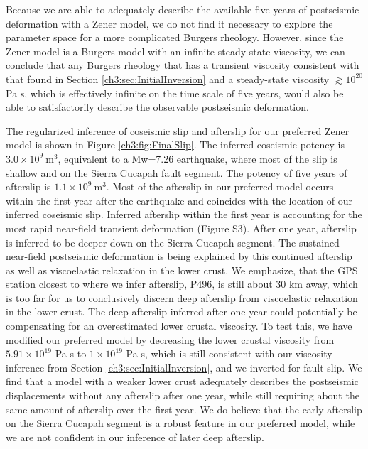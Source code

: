 Because we are able to adequately describe the available five years of postseismic deformation with a Zener model, we do not find it necessary to explore the parameter space for a more complicated Burgers rheology.  However, since the Zener model is a Burgers model with an infinite steady-state viscosity, we can conclude that any Burgers rheology that has a transient viscosity consistent with that found in Section \ref{ch3:sec:InitialInversion} and a steady-state viscosity $\gtrsim10^{20}$ Pa s, which is effectively infinite on the time scale of five years, would also be able to satisfactorily describe the observable postseismic deformation.        
  
The regularized inference of coseismic slip and afterslip for our preferred Zener model is shown in Figure \ref{ch3:fig:FinalSlip}.  The inferred coseismic potency is $3.0\times10^{9}\ \mathrm{m}^3$, equivalent to a Mw=7.26 earthquake, where most of the slip is shallow and on the Sierra Cucapah fault segment.  The potency of five years of afterslip is $1.1\times10^{9}\ \mathrm{m}^3$. Most of the afterslip in our preferred model occurs within the first year after the earthquake and coincides with the location of our inferred coseismic slip. Inferred afterslip within the first year is accounting for the most rapid near-field transient deformation (Figure S3).  After one year, afterslip is inferred to be deeper down on the Sierra Cucapah segment.  The sustained near-field postseismic deformation is being explained by this continued afterslip as well as viscoelastic relaxation in the lower crust. We emphasize, that the GPS station closest to where we infer afterslip, P496, is still about 30 km away, which is too far for us to conclusively discern deep afterslip from viscoelastic relaxation in the lower crust.  The deep afterslip inferred after one year could potentially be compensating for an overestimated lower crustal viscosity.  To test this, we have modified our preferred model by decreasing the lower crustal viscosity from $5.91\times10^{19}$ Pa s to $1\times10^{19}$ Pa s, which is still consistent with our viscosity inference from Section \ref{ch3:sec:InitialInversion}, and we inverted for fault slip.  We find that a model with a weaker lower crust adequately describes the postseismic displacements without any afterslip after one year, while still requiring about the same amount of afterslip over the first year. We do believe that the early afterslip on the Sierra Cucapah segment is a robust feature in our preferred model, while we are not confident in our inference of later deep afterslip.                   

